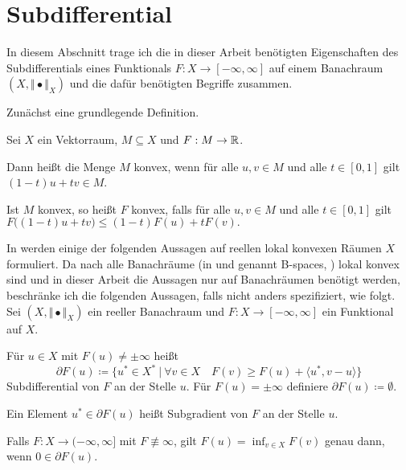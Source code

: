 \section{Subdifferential}
In diesem Abschnitt trage ich die in dieser Arbeit benötigten Eigenschaften 
des Subdifferentials eines Funktionals $F:X\to [-\infty,\infty]$ 
auf einem Banachraum 
$(X,\Vert\bullet\Vert_X)$ und die dafür benötigten Begriffe zusammen.

Zunächst eine grundlegende Definition.

\begin{definition}
  Sei $X$ ein Vektorraum, $M\subseteq X$ und $F:M\to\mathbb{R}$. 
  
  Dann heißt die Menge $M$ konvex, wenn für alle $u,v\in M$ und alle $t\in
  [0,1]$ gilt $(1-t)u+tv\in M$.

  Ist $M$ konvex, so heißt $F$ konvex, falls für alle $u,v\in M$ und alle
  $t\in[0,1]$ gilt $F\big( (1-t)u+tv\big)\leq (1-t)F(u)+t F(v).$
\end{definition}

In \cite{Zei85} werden einige der folgenden Aussagen auf reellen lokal konvexen
Räumen $X$ formuliert.
Da nach \cite[S. 781, (43)]{Zei86} alle Banachräume 
(in \cite{Zei86} und \cite{Zei85} genannt \glqq B-spaces\grqq, \cite[S.
786]{Zei86}) lokal
konvex sind und in dieser Arbeit die Aussagen nur auf Banachräumen benötigt
werden, beschränke ich
die folgenden Aussagen, falls nicht anders spezifiziert, wie folgt.
Sei $(X,\Vert\bullet\Vert_X)$ ein reeller Banachraum und
$F:X\to [-\infty,\infty]$ ein Funktional auf $X$.

\begin{definition}
  \label{def:subdifferential}
  Für $u\in X$ mit $F(u)\neq\pm\infty$ heißt
  \begin{equation}
    \label{eq:subdifferential}
    \partial F(u)\coloneq 
    \{u^\ast\in X^\ast\ |\ 
    \forall v\in X\quad F(v)\geq F(u)+\langle u^\ast,v-u\rangle\}  
  \end{equation}
  Subdifferential von $F$ an der Stelle $u$. Für $F(u)=\pm\infty$ definiere
  $\partial F(u)\coloneq\emptyset$.

  Ein Element $u^\ast\in\partial F(u)$ heißt Subgradient von $F$ an der Stelle
  $u$.
\end{definition}

\begin{theorem}
  \label{thm:extremalprinciple}
  Falls $F: X\to (-\infty,\infty]$ mit $F\nequiv\infty$, gilt
  $F(u)=\inf_{v\in X}F(v)$ genau dann, wenn $0\in\partial F(u)$.
\end{theorem}

